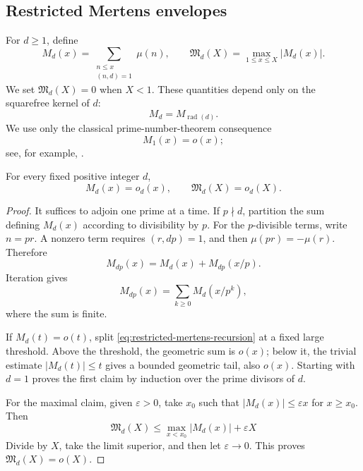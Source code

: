 \subsection{Restricted Mertens envelopes}

For \(d\ge1\), define
\begin{equation}
 M_d(x)
 =
 \sum_{\substack{n\le x\\(n,d)=1}}\mu(n),
 \qquad
 \mathfrak M_d(X)
 =
 \max_{1\le x\le X}|M_d(x)|.
\label{eq:restricted-mertens}
\end{equation}
We set \(\mathfrak M_d(X)=0\) when \(X<1\).
These quantities depend only on the squarefree kernel of \(d\):
\[
 M_d=M_{\operatorname{rad}(d)}.
\]
We use only the classical prime-number-theorem consequence
\[
 M_1(x)=o(x);
\]
see, for example, \citet[Chapter 5]{IwaniecKowalski2004}.

\begin{lemma}
\label{lem:fixed-d-mertens}
For every fixed positive integer \(d\),
\begin{equation}
 M_d(x)=o_d(x),
 \qquad
 \mathfrak M_d(X)=o_d(X).
\label{eq:fixed-d-mertens}
\end{equation}
\end{lemma}

\begin{proof}
It suffices to adjoin one prime at a time.  If \(p\nmid d\), partition the
sum defining \(M_d(x)\) according to divisibility by \(p\).  For the
\(p\)-divisible terms, write \(n=pr\).  A nonzero term requires
\((r,dp)=1\), and then \(\mu(pr)=-\mu(r)\).  Therefore
\[
 M_{dp}(x)=M_d(x)+M_{dp}(x/p).
\]
Iteration gives
\begin{equation}
 M_{dp}(x)=\sum_{k\ge0}M_d(x/p^k),
\label{eq:restricted-mertens-recursion}
\end{equation}
where the sum is finite.

If \(M_d(t)=o(t)\), split \eqref{eq:restricted-mertens-recursion} at a
fixed large threshold.  Above the threshold, the geometric sum is
\(o(x)\); below it, the trivial estimate \(|M_d(t)|\le t\) gives a bounded
geometric tail, also \(o(x)\).  Starting with \(d=1\) proves the first
claim by induction over the prime divisors of \(d\).

For the maximal claim, given \(\varepsilon>0\), take \(x_0\) such that
\(|M_d(x)|\le\varepsilon x\) for \(x\ge x_0\).  Then
\[
 \mathfrak M_d(X)
 \le
 \max_{x<x_0}|M_d(x)|+\varepsilon X
\]
Divide by \(X\), take the limit superior, and then let
\(\varepsilon\to0\).  This proves \(\mathfrak M_d(X)=o(X)\).
\end{proof}

